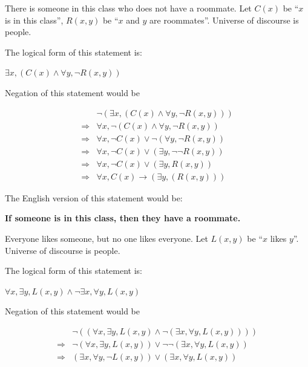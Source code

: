 \documentclass[]{article}
\begin{document}
\begin{question}{2}
    There is someone in this class who does not have a roommate. Let $C(x)$ be “$x$ is in this class”,
$R(x, y)$ be “$x$ and $y$ are roommates”. Universe of discourse is people.
\end{question}

The logical form of this statement is:

\begin{center}
    $\exists x, (C(x) \land \forall y, \neg R(x, y))$
\end{center}

Negation of this statement would be

\begin{align*}
    &  \neg(\exists x, (C(x) \land \forall y, \neg R(x, y))) \\
    \Rightarrow &  \forall x, \neg (C(x) \land \forall y, \neg R(x, y)) \\
    \Rightarrow &  \forall x, \neg C(x) \lor \neg(\forall y, \neg R(x, y)) \\
    \Rightarrow &  \forall x, \neg C(x) \lor (\exists y, \neg\neg R(x, y)) \\
    \Rightarrow &  \forall x, \neg C(x) \lor (\exists y, R(x, y)) \\
    \Rightarrow & \forall x, C(x) \rightarrow  (\exists y, (R(x, y)))
\end{align*}

The English version of this statement would be:

\begin{center}
    \bf{If someone is in this class, then they have a roommate.}
\end{center}

\begin{question}{3}
    Everyone likes someone, but no one likes everyone. Let $L(x, y)$ be “$x$ likes $y$”. Universe of
discourse is people.
\end{question}

The logical form of this statement is:

\begin{center}
    $\forall x, \exists y, L(x, y) \land \neg \exists x, \forall y, L(x, y)$
\end{center}

Negation of this statement would be

\begin{align*}
    & \neg((\forall x, \exists y, L(x, y) \land \neg (\exists x, \forall y, L(x, y)))) \\
    \Rightarrow & \neg (\forall x, \exists y, L(x, y)) \lor \neg\neg(\exists x, \forall y, L(x, y)) \\
    \Rightarrow & (\exists x, \forall y, \neg L(x, y)) \lor (\exists x, \forall y, L(x, y)) \\
\end{align*}
\end{document}
